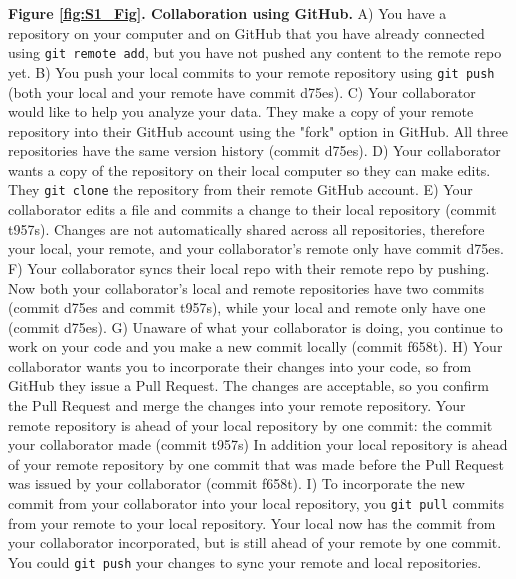 \textbf{\label{fig:S1_Fig}}

\textbf{Figure \ref{fig:S1_Fig}. Collaboration using GitHub.}
A) You have a repository on your computer and on GitHub that you have already connected using \verb|git remote add|, but you have not pushed any content to the remote repo yet.
B) You push your local commits to your remote repository using \verb|git push| (both your local and your remote have commit d75es).
C) Your collaborator would like to help you analyze your data.
They make a copy of your remote repository into their GitHub account using the "fork" option in GitHub.
All three repositories have the same version history (commit d75es).
D) Your collaborator wants a copy of the repository on their local computer so they can make edits.
They \verb|git clone| the repository from their remote GitHub account.
E) Your collaborator edits a file and commits a change to their local repository (commit t957s).
Changes are not automatically shared across all repositories, therefore your local, your remote, and your collaborator's remote only have commit d75es.
F) Your collaborator syncs their local repo with their remote repo by pushing.
Now both your collaborator's local and remote repositories have two commits (commit d75es and commit t957s), while your local and remote only have one (commit d75es).
G) Unaware of what your collaborator is doing, you continue to work on your code and you make a new commit locally (commit f658t).
H) Your collaborator wants you to incorporate their changes into your code, so from GitHub they issue a Pull Request.
The changes are acceptable, so you confirm the Pull Request and merge the changes into your remote repository.
Your remote repository is ahead of your local repository by one commit: the commit your collaborator made (commit t957s)
In addition your local repository is ahead of your remote repository by one commit that was made before the Pull Request was issued by your collaborator (commit f658t).
I) To incorporate the new commit from your collaborator into your local repository, you \verb|git pull| commits from your remote to your local repository.
Your local now has the commit from your collaborator incorporated, but is still ahead of your remote by one commit.
You could \verb|git push| your changes to sync your remote and local repositories.
